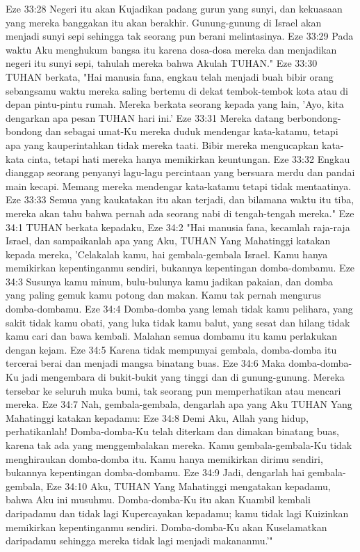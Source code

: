 Eze 33:28  Negeri itu akan Kujadikan padang gurun yang sunyi, dan kekuasaan yang mereka banggakan itu akan berakhir. Gunung-gunung di Israel akan menjadi sunyi sepi sehingga tak seorang pun berani melintasinya.
Eze 33:29  Pada waktu Aku menghukum bangsa itu karena dosa-dosa mereka dan menjadikan negeri itu sunyi sepi, tahulah mereka bahwa Akulah TUHAN."
Eze 33:30  TUHAN berkata, "Hai manusia fana, engkau telah menjadi buah bibir orang sebangsamu waktu mereka saling bertemu di dekat tembok-tembok kota atau di depan pintu-pintu rumah. Mereka berkata seorang kepada yang lain, 'Ayo, kita dengarkan apa pesan TUHAN hari ini.'
Eze 33:31  Mereka datang berbondong-bondong dan sebagai umat-Ku mereka duduk mendengar kata-katamu, tetapi apa yang kauperintahkan tidak mereka taati. Bibir mereka mengucapkan kata-kata cinta, tetapi hati mereka hanya memikirkan keuntungan.
Eze 33:32  Engkau dianggap seorang penyanyi lagu-lagu percintaan yang bersuara merdu dan pandai main kecapi. Memang mereka mendengar kata-katamu tetapi tidak mentaatinya.
Eze 33:33  Semua yang kaukatakan itu akan terjadi, dan bilamana waktu itu tiba, mereka akan tahu bahwa pernah ada seorang nabi di tengah-tengah mereka."
Eze 34:1  TUHAN berkata kepadaku,
Eze 34:2  "Hai manusia fana, kecamlah raja-raja Israel, dan sampaikanlah apa yang Aku, TUHAN Yang Mahatinggi katakan kepada mereka, 'Celakalah kamu, hai gembala-gembala Israel. Kamu hanya memikirkan kepentinganmu sendiri, bukannya kepentingan domba-dombamu.
Eze 34:3  Susunya kamu minum, bulu-bulunya kamu jadikan pakaian, dan domba yang paling gemuk kamu potong dan makan. Kamu tak pernah mengurus domba-dombamu.
Eze 34:4  Domba-domba yang lemah tidak kamu pelihara, yang sakit tidak kamu obati, yang luka tidak kamu balut, yang sesat dan hilang tidak kamu cari dan bawa kembali. Malahan semua dombamu itu kamu perlakukan dengan kejam.
Eze 34:5  Karena tidak mempunyai gembala, domba-domba itu tercerai berai dan menjadi mangsa binatang buas.
Eze 34:6  Maka domba-domba-Ku jadi mengembara di bukit-bukit yang tinggi dan di gunung-gunung. Mereka tersebar ke seluruh muka bumi, tak seorang pun memperhatikan atau mencari mereka.
Eze 34:7  Nah, gembala-gembala, dengarlah apa yang Aku TUHAN Yang Mahatinggi katakan kepadamu:
Eze 34:8  Demi Aku, Allah yang hidup, perhatikanlah! Domba-domba-Ku telah diterkam dan dimakan binatang buas, karena tak ada yang menggembalakan mereka. Kamu gembala-gembala-Ku tidak menghiraukan domba-domba itu. Kamu hanya memikirkan dirimu sendiri, bukannya kepentingan domba-dombamu.
Eze 34:9  Jadi, dengarlah hai gembala-gembala,
Eze 34:10  Aku, TUHAN Yang Mahatinggi mengatakan kepadamu, bahwa Aku ini musuhmu. Domba-domba-Ku itu akan Kuambil kembali daripadamu dan tidak lagi Kupercayakan kepadamu; kamu tidak lagi Kuizinkan memikirkan kepentinganmu sendiri. Domba-domba-Ku akan Kuselamatkan daripadamu sehingga mereka tidak lagi menjadi makananmu.'"
